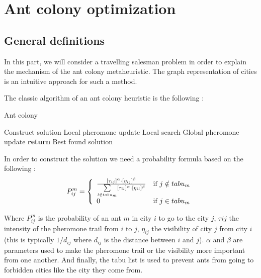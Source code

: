 \documentclass[UTF8, twoside]{EPURapport}
\begin{document}
\chapter{Ant colony optimization}

\section{General definitions}

 	\hspace{4ex}In this part, we will consider a travelling salesman problem in order to explain the mechanism of the ant colony metaheuristic. The graph representation of cities is an intuitive approach for such a method.
	
	
	The classic algorithm of an ant colony heuristic is the following :

\begin{algorithm}
  \caption{Ant colony}
  \begin{algorithmic}[1]
        	\State Construct solution
			\State Local pheromone update
        \EndFor
        \State Local search
        \State Global pheromone update
      \EndFor
      \State \textbf{return} Best found solution
  \end{algorithmic}
\end{algorithm}

	In order to construct the solution we need a probability formula based on the following :
	\\

\[
P^m_{ij}= \left\{ 
\begin{array}{l r}
\frac{[\tau_{ij}]^\alpha \cdot [\eta_{ij}]^\beta}{\underset{l\notin tabu_m}{\sum}[\tau_{il}]^\alpha \cdot [\eta_{il}]^\beta} & \text{if } j\notin tabu_m\\
0 & \text{if } j\in tabu_m
\end{array}
\right.
\]

	Where $P^m_{ij}$ is the probability of an ant $m$ in city $i$ to go to the city $j$, $\tau{ij}$ the intensity of the pheromone trail from $i$ to $j$, $\eta_{ij}$  the visibility of city $j$ from city $i$ (this is typically $1/d_{ij}$ where $d_{ij}$ is the distance between $i$ and $j$). $\alpha$ and $\beta$ are parameters used to make the pheromone trail or the visibility more important from one another. And finally, the tabu list is used to prevent ants from going to forbidden cities like the city they come from.
\\
\end{document}
